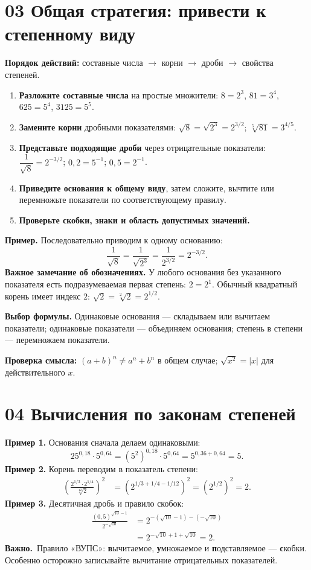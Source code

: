 \documentclass[a4paper,12pt]{article}
\newcommand{\key}[1]{\textbf{\textcolor{darkaccent}{#1}}}
\newcommand{\attention}[1]{\medskip\noindent\textcolor{darkaccent}{\bfseries Важно.}\ #1\par\medskip}
\begin{document}
\section*{03 \quad Общая стратегия: привести к степенному виду}
\key{Порядок действий:} составные числа $\rightarrow$ корни $\rightarrow$ дроби $\rightarrow$ свойства степеней.
\begin{enumerate}
\item \textbf{Разложите составные числа} на простые множители: $8=2^3$, $81=3^4$, $625=5^4$, $3125=5^5$.
\item \textbf{Замените корни} дробными показателями: $\sqrt8=\sqrt{2^3}=2^{3/2}$; $\sqrt[5]{81}=3^{4/5}$.
\item \textbf{Представьте подходящие дроби} через отрицательные показатели: $\dfrac1{\sqrt8}=2^{-3/2}$; $0{,}2=5^{-1}$; $0{,}5=2^{-1}$.
\item \textbf{Приведите основания к общему виду}, затем сложите, вычтите или перемножьте показатели по соответствующему правилу.
\item \textbf{Проверьте скобки, знаки и область допустимых значений.}
\end{enumerate}
\textbf{Пример.} Последовательно приводим к одному основанию:
\[
\frac{1}{\sqrt8}=
\frac1{\sqrt{2^3}}=\frac1{2^{3/2}}=\boxed{2^{-3/2}}.
\]
\textbf{Важное замечание об обозначениях.} У любого основания без указанного показателя есть подразумеваемая первая степень: $2=2^1$. Обычный квадратный корень имеет индекс $2$: $\sqrt2=\sqrt[2]{2}=2^{1/2}$.

\textbf{Выбор формулы.} Одинаковые основания --- складываем или вычитаем показатели; одинаковые показатели --- объединяем основания; степень в степени --- перемножаем показатели.

\textbf{Проверка смысла:} $(a+b)^n\ne a^n+b^n$ в общем случае; $\sqrt{x^2}=|x|$ для действительного $x$.

\section*{04 \quad Вычисления по законам степеней}
\textbf{Пример 1.} Основания сначала делаем одинаковыми:
\[
25^{0{,}18}\cdot5^{0{,}64}
=(5^2)^{0{,}18}\cdot5^{0{,}64}
=5^{0{,}36+0{,}64}=\boxed5.
\]
\textbf{Пример 2.} Корень переводим в показатель степени:
\[
\begin{aligned}
\left(\frac{2^{1/3}\cdot2^{1/4}}{\sqrt[12]{2}}\right)^2
&=\left(2^{1/3+1/4-1/12}\right)^2
=\left(2^{1/2}\right)^2=\boxed2.
\end{aligned}
\]
\textbf{Пример 3.} Десятичная дробь и правило скобок:
\[
\begin{aligned}
\frac{(0{,}5)^{\sqrt{10}-1}}{2^{-\sqrt{10}}}
&=2^{-(\sqrt{10}-1)-(-\sqrt{10})}\\
&=2^{-\sqrt{10}+1+\sqrt{10}}=\boxed2.
\end{aligned}
\]
\attention{Правило «ВУПС»: \textbf{в}ычитаемое, \textbf{у}множаемое и \textbf{п}одставляемое --- \textbf{с}кобки. Особенно осторожно записывайте вычитание отрицательных показателей.}
\end{document}
